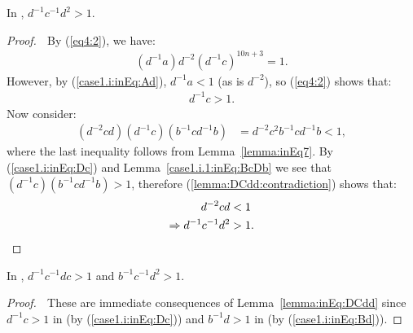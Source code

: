 \begin{lemma} In , $d^{-1}c^{-1}d^{2}>1$.\label{lemma:inEq:DCdd}
\end{lemma}
\begin{proof} $\;$ By (\ref{eq4:2}), we have:
\begin{align*}
(d^{-1}a)d^{-2}(d^{-1}c)^{10n+3}=1.
\end{align*}
However, by (\ref{case1.i:inEq:Ad}), $d^{-1}a<1$ (as is $d^{-2}$), so (\ref{eq4:2}) shows that:
\begin{align}
d^{-1}c>1.\label{case1.i:inEq:Dc}
\end{align}
Now consider:
\begin{align}
(d^{-2}cd)(d^{-1}c)(b^{-1}cd^{-1}b)&=d^{-2}c^{2}b^{-1}cd^{-1}b<1,\label{lemma:DCdd:contradiction}
\end{align}
where the last inequality follows from Lemma~\ref{lemma:inEq7}. By (\ref{case1.i:inEq:Dc}) and Lemma~\ref{case1.i.1:inEq:BcDb} we see that $(d^{-1}c)(b^{-1}cd^{-1}b)>1$, therefore (\ref{lemma:DCdd:contradiction}) shows that:
\begin{align*}
d^{-2}cd&<1\\
\Rightarrow{}d^{-1}c^{-1}d^{2}&>1.\qedhere
\end{align*}
\end{proof}

\begin{corollary} In , $d^{-1}c^{-1}dc>1$ and $b^{-1}c^{-1}d^{2}>1$.\label{corollary:inEq:DCdd}
\end{corollary}
\begin{proof} $\;$ These are immediate consequences of Lemma~\ref{lemma:inEq:DCdd} since $d^{-1}c>1$ in  (by (\ref{case1.i:inEq:Dc})) and $b^{-1}d>1$ in  (by (\ref{case1.i:inEq:Bd})).
\end{proof}

